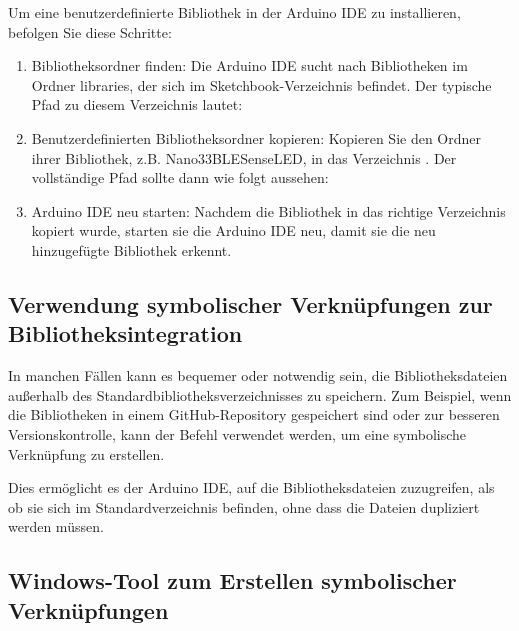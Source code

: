 Um eine benutzerdefinierte Bibliothek in der Arduino IDE zu installieren, befolgen Sie diese Schritte: 

\begin{enumerate}
	\item Bibliotheksordner finden: 
	Die Arduino IDE sucht nach Bibliotheken im Ordner libraries, der sich im Sketchbook-Verzeichnis befindet. 
	Der typische Pfad zu diesem Verzeichnis lautet: 
	
	\medskip
	
	{\small{}}
	
	\item Benutzerdefinierten Bibliotheksordner kopieren: 
	Kopieren Sie den Ordner ihrer Bibliothek, z.B. Nano33BLESenseLED, in das Verzeichnis . 
	Der vollständige Pfad sollte dann wie folgt aussehen: 
	
	\medskip
	
	{\small{}}
	
	\item Arduino IDE neu starten: 
	Nachdem die Bibliothek in das richtige Verzeichnis kopiert wurde, starten sie die Arduino IDE neu, 
	damit sie die neu hinzugefügte Bibliothek erkennt. 
	
\end{enumerate}

\subsection{Verwendung symbolischer Verknüpfungen zur Bibliotheksintegration}

In manchen Fällen kann es bequemer oder notwendig sein, die Bibliotheksdateien außerhalb des Standardbibliotheksverzeichnisses zu speichern. 
Zum Beispiel, wenn die Bibliotheken in einem GitHub-Repository gespeichert sind oder zur besseren Versionskontrolle, kann der Befehl  verwendet werden, um eine symbolische Verknüpfung zu erstellen. 

Dies ermöglicht es der Arduino IDE, auf die Bibliotheksdateien zuzugreifen, als ob sie sich im Standardverzeichnis befinden, ohne dass die Dateien dupliziert werden müssen. 


\subsection{Windows-Tool  zum Erstellen symbolischer Verknüpfungen}

